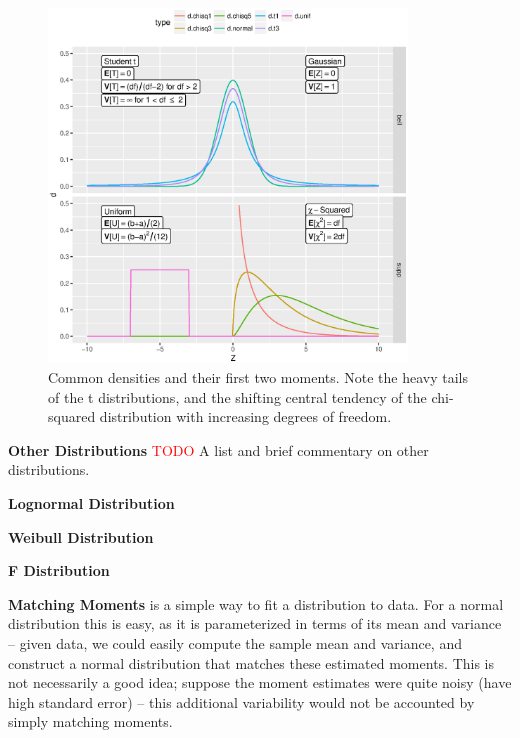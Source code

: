 \documentclass[../primer.tex]{subfiles}
\begin{document}
\begin{figure}[!ht]
  \centering
  \includegraphics[width=0.85\textwidth]{./images/dist_sheet}

  \caption{Common densities and their first two moments. Note the heavy tails of
    the t distributions, and the shifting central tendency of the chi-squared
    distribution with increasing degrees of freedom.}
  \label{fig:dist-sheet}
\end{figure}

\noindent\textbf{Other Distributions} \textcolor{red}{TODO} A list and brief
commentary on other distributions.

\noindent\textbf{Lognormal Distribution}

\noindent\textbf{Weibull Distribution}

\noindent\textbf{F Distribution}

\noindent\textbf{Matching Moments} is a simple way to fit a distribution to
data. For a normal distribution this is easy, as it is parameterized in terms of
its mean and variance -- given data, we could easily compute the sample mean and
variance, and construct a normal distribution that matches these estimated
moments. This is not necessarily a good idea; suppose the moment estimates were
quite noisy (have high standard error) -- this additional variability would not
be accounted by simply matching moments.
\end{document}
